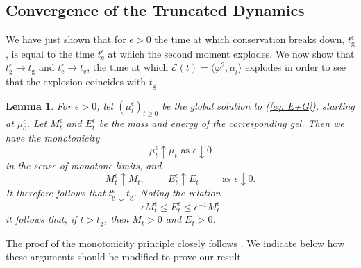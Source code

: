 \documentclass[11pt, notitlepage]{article}
\newtheorem{lem}[thm]{Lemma}
\begin{document}
\subsection{\textbf{Convergence of the Truncated Dynamics}}
We have just shown that for $\epsilon > 0$ the time at which conservation breaks down, $t_\mathrm{g}^\epsilon$, is equal to the time $t_\mathrm{e}^\epsilon$ at which the second moment explodes.
We now show that $t_\mathrm{g}^\epsilon \rightarrow t_\mathrm{g}$ and $t_\mathrm{e}^\epsilon \rightarrow t_\mathrm{e}$, the time at which $\mathcal{E}(t)=\langle \varphi^2, \mu_t\rangle$ explodes in order to see that the explosion coincides with $t_\mathrm{g}$.
\begin{lem}\label{lemma: connecting mu-epsilon and mu}
    For $\epsilon>0$, let $(\mu^\epsilon_t)_{t\geq 0}$ be the global solution to (\ref{eq: E+G}), starting at $\mu_0^\epsilon.$ Let $M^\epsilon_t$ and $E^\epsilon_t$ be the mass and energy of the corresponding gel. Then we have  the monotonicity \begin{equation}\label{eq: monontonicity for muepsilont}
        \mu^\epsilon_t \uparrow \mu_t \text{ as }\epsilon\downarrow 0
    \end{equation} in the sense of monotone limits, and\begin{equation} \label{eq: monotonicity for gel data}
        M^\epsilon_t \uparrow M_t; \hspace{1cm} E^\epsilon_t \uparrow E_t \hspace{1cm} \text{as }\epsilon\downarrow 0.
    \end{equation}
It therefore follows that $t^\epsilon_\mathrm{g}\downarrow t_\mathrm{g}$. Noting the relation \begin{equation}\label{eq: Mepsilon and Eepsilon}
        \epsilon M^\epsilon_t \leq E^\epsilon_t \leq \epsilon^{-1}M^\epsilon_t
    \end{equation}it follows that, if $t>t_\mathrm{g}$, then $M_t >0$ and $E_t>0$.
\end{lem}
The proof of the monotonicity principle closely follows \cite[Propositions 2.4,  2.7]{N00}. We indicate below how these arguments should be modified to prove our result.
\end{document}
